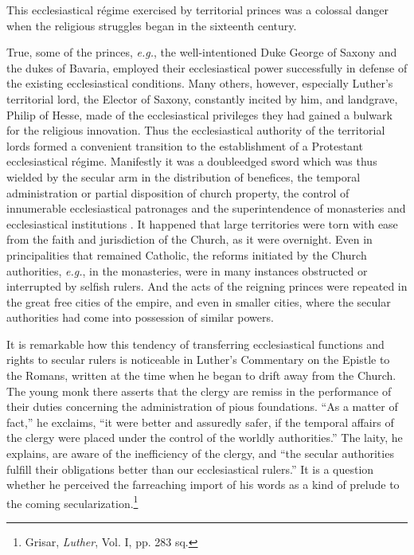 This ecclesiastical régime exercised by territorial princes was a
colossal danger when the religious struggles began in the sixteenth
century.

True, some of the princes, \textit{e.g.}, the well-intentioned Duke George
of Saxony and the dukes of Bavaria, employed their ecclesiastical
power successfully in defense of the existing ecclesiastical conditions.
Many others, however, especially Luther’s territorial lord, the Elector
of Saxony, constantly incited by him, and landgrave, Philip of Hesse,
made of the ecclesiastical privileges they had gained a bulwark for
the religious innovation. Thus the ecclesiastical authority of the
territorial lords formed a convenient transition to the establishment
of a Protestant ecclesiastical régime. Manifestly it was a doubleedged
sword which was thus wielded by the secular arm in the
distribution of benefices, the temporal administration or partial disposition
of church property, the control of innumerable ecclesiastical patronages
and the superintendence of monasteries and ecclesiastical institutions
. It happened that large territories were torn with
ease from the faith and jurisdiction of the Church, as it were overnight.
Even in principalities that remained Catholic, the reforms
initiated by the Church authorities, \textit{e.g.}, in the monasteries, were
in many instances obstructed or interrupted by selfish rulers. And
the acts of the reigning princes were repeated in the great free cities
of the empire, and even in smaller cities, where the secular authorities
had come into possession of similar powers.

It is remarkable how this tendency of transferring ecclesiastical
functions and rights to secular rulers is noticeable in Luther’s Commentary
on the Epistle to the Romans, written at the time when he
began to drift away from the Church. The young monk there asserts
that the clergy are remiss in the performance of their duties concerning
the administration of pious foundations. “As a matter of fact,” he
exclaims, “it were better and assuredly safer, if the temporal affairs of
the clergy were placed under the control of the worldly authorities.”
The laity, he explains, are aware of the inefficiency of the clergy, and
“the secular authorities fulfill their obligations better than our ecclesiastical
rulers.” It is a question whether he perceived the farreaching
import of his words as a kind of prelude to the coming
secularization.\footnote{Grisar, \textit{Luther}, Vol. I, pp. 283 sq.}

